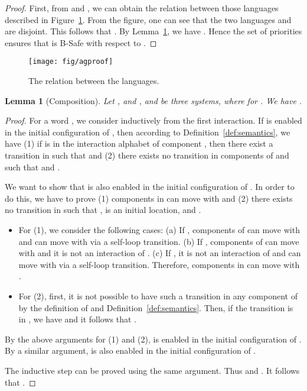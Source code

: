 \documentclass[10pt, a4paper, onecolumn, conference, compsocconf]{IEEEtran}
\newtheorem{lemma}{Lemma}
\begin{document}
\begin{proof}
First, from  and , we can obtain the relation between those languages described in Figure~\ref{fig:agproof}. From the figure, one can see that the two languages  and  are disjoint. This follows that . By Lemma~\ref{lem:composition}, we have . Hence the set of priorities  ensures that  is B-Safe with respect to .
\end{proof}

\begin{figure}
\centering
 \texttt{[image: fig/agproof]}
  \caption{The relation between the languages.}
 \label{fig:agproof}
\end{figure}

\begin{lemma}[Composition]\label{lem:composition}
Let , and , and 
be three systems, where  for . We have .
\end{lemma}
\begin{proof}
For a word , we consider inductively from the first interaction.
If  is enabled in the initial configuration  of , then according to Definition~\ref{def:semantics}, we have (1) if  is in the interaction alphabet of component , then there exist a transition  in  such that  and (2) there exists no transition  in components of  and  such that  and .

We want to show that  is also enabled in the initial configuration of . In order to do this, we have to prove (1) components in
 can move with  and (2) there exists no transition  in  such that ,  is an initial location, and .
\begin{itemize}
  \item For (1), we consider the following cases:
        (a) If , components of  can move with  and  can move with  via a self-loop transition.
        (b) If , components of  can move with  and it is not an interaction of .
        (c) If , it is not an interaction of  and  can move with  via a self-loop transition.
        Therefore, components in  can move with .

  \item For (2), first, it is not possible to have such a transition in any component of
         by the definition of  and Definition~\ref{def:semantics}. Then, if the transition is in , we have  and it follows that .
\end{itemize}

By the above arguments for (1) and (2),  is enabled in the initial configuration of . By a similar argument,  is also enabled in the initial configuration of .

The inductive step can be proved using the same argument. Thus  and .
It follows that .
\end{proof}
\end{document}
